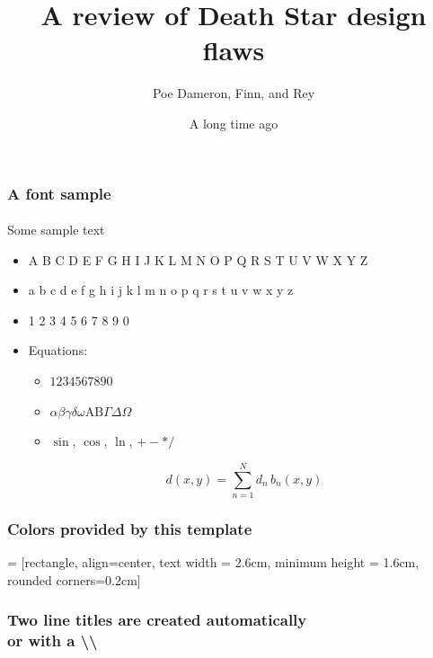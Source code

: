 \documentclass{beamer}
\title{A review of Death Star design flaws}
\date{A long time ago}
\author{Poe Dameron, Finn, and Rey}
\begin{document}
\insertTitleSlide



\begin{frame} 
\frametitle{A font sample} 
\framesubtitle{\printcurrentfont} 

Some sample text
\begin{itemize}
	\item A B C D E F G H I J K L M N O P Q R S T U V W X Y Z
	\item a b c d e f g h i j k l m n o p q r s t u v w x y z
	\item 1 2 3 4 5 6 7 8 9 0
	\item Equations:
	\begin{itemize}
		\item $1 2 3 4 5 6 7 8 9 0$
		\item $\alpha \beta \gamma \delta \omega \text{A} \text{B} \Gamma \Delta \Omega$
		\item $\sin$, $\cos$, $\ln$, $+ - * /$
	\end{itemize}
	
	\begin{equation}
		d\left( x, y \right) = \sum_{n=1}^N d_n \, b_n \left( x, y \right)
	\end{equation}
\end{itemize}

\end{frame}



\begin{frame}[fragile]
\frametitle{Colors provided by this template}
\centering
{} = [rectangle,
                               align=center, 
                               text width = 2.6cm,
                               minimum height = 1.6cm,
                               rounded corners=0.2cm]
                               
\newcommand{\colorSampleNode}[2]{
    \node[colorSampleNodeTemplate, fill=#1, text=#2] 
        {#1\\\HTMLcolor{#1}};
        }


\end{frame}



\begin{frame} 
\frametitle{Two line titles are created automatically\\or with a \textbackslash\textbackslash}  
\lipsum[1]
\end{frame}


\insertLastSlide
\end{document}
